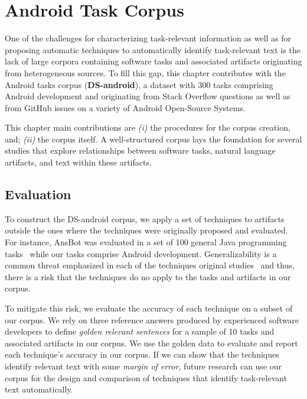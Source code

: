 \setcounter{chapter}{3}
\setcounter{rq}{1}


\chapter{Android Task Corpus}
\label{ch:android-corpus}



One of the challenges for characterizing task-relevant information as well as for proposing automatic techniques to automatically identify task-relevant text is
the lack of large corpora containing
software tasks and associated artifacts originating from heterogeneous sources.
To fill this gap, this chapter contributes with the Android tasks corpus (\textbf{\acs{DS-android}}), a dataset with 300 tasks comprising Android development and originating from Stack Overflow questions
as well as from GitHub issues on a variety of Android Open-Source Systems.



This chapter main contributions are \textit{(i)} the procedures for the corpus creation, and; \textit{(ii)} the corpus itself. A well-structured corpus lays the foundation for several studies that explore relationships between software tasks, natural language artifacts, and text within these artifacts. 








\clearpage

\section{Evaluation}
\label{cp4:evaluation}


To construct the \acs{DS-android} corpus, we apply a set of techniques 
to artifacts outside the ones where the techniques were originally proposed and evaluated.
For instance, \acs{AnsBot} was evaluated in a set of 100 general Java programming tasks~\cite{Xu2017} while our tasks comprise Android development.
Generalizability is a common threat emphasized in each of the techniques original studies~\cite{Xu2017, Lotufo2012, Robillard2015} and thus, there is a risk that the techniques do no apply to 
the tasks and artifacts in our corpus.




To mitigate this risk, we evaluate the accuracy of each technique on a subset of our corpus. We rely on three reference answers produced by 
experienced software developers to define \textit{golden relevant sentences} 
for a sample of 10 tasks and associated artifacts in our corpus. 
We use the golden data to evaluate and report each technique's accuracy in our corpus.
If we can show that the techniques identify relevant text with some \textit{margin of error},
future research can use our corpus for the design and comparison of techniques that identify task-relevant text automatically.


